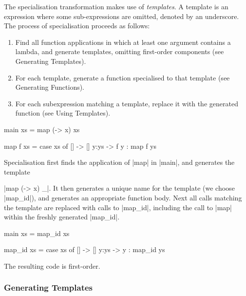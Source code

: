 The specialisation transformation makes use of \textit{templates}. A template is an expression where some sub-expressions are omitted, denoted by an underscore. The process of specialisation proceeds as follows:

\begin{enumerate}
\item Find all function applications in which at least one argument contains a lambda, and generate templates, omitting first-order components (see Generating Templates).
\item For each template, generate a function specialised to that template (see Generating Functions).
\item For each subexpression matching a template, replace it with the generated function (see Using Templates).
\end{enumerate}

\begin{example}
\label{exF:map_id}
\begin{code}
main xs = map (\x -> x) xs

map f xs = case  xs of
                 []    -> []
                 y:ys  -> f y : map f ys
\end{code}

Specialisation first finds the application of |map| in |main|, and generates the template \ignore|map (\x -> x) _|. It then generates a unique name for the template (we choose |map_id|), and generates an appropriate function body. Next all calls matching the template are replaced with calls to |map_id|, including the call to |map| within the freshly generated |map_id|.

\begin{code}
main xs = map_id xs

map_id xs = case  xs of
                  []    -> []
                  y:ys  -> y : map_id ys
\end{code}

\noindent The resulting code is first-order.
\end{example}

\subsubsection{Generating Templates}
\label{secF:generate_templates}


